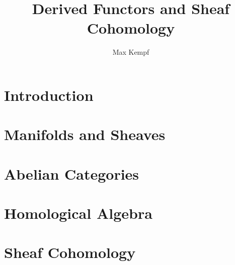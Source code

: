 \documentclass[a4paper, 12pt]{article}
\theoremstyle{definition}
\theoremstyle{remark}
\begin{document}
\title{Derived Functors and Sheaf Cohomology}
\author{Max Kempf}
\maketitle

\newpage
\mbox{}


\newpage
\tableofcontents

\newpage
\section{Introduction}



\newpage
\section{Manifolds and Sheaves}



\newpage
\section{Abelian Categories}



\newpage
\section{Homological Algebra}


\newpage
\section{Sheaf Cohomology}


\newpage
\mbox{}

\newpage



\newpage
\mbox{}
\end{document}
